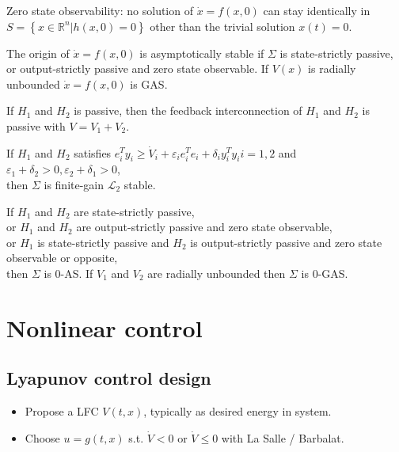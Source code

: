 \begin{definition}
    Zero state observability: no solution of $\dot{x}=f(x, 0)$ can stay identically in $S=\left\{x \in \mathbb{R}^{n} | h(x, 0)=0\right\}$ other than the trivial solution $x(t)=0$.
\end{definition}
\begin{lemma}
    The origin of $\dot{x}=f(x, 0)$ is asymptotically stable if $\Sigma$ is state-strictly passive, or output-strictly passive and zero state observable.
    If $V(x)$ is radially unbounded $\dot{x}=f(x, 0)$ is GAS.
\end{lemma}

\begin{theorem}
    If $H_1$ and $H_2$ is passive, then the feedback interconnection of $H_1$ and $H_2$ is passive with $V=V_1+V_2$.
\end{theorem}
\begin{theorem}
    If $H_1$ and $H_2$ satisfies $e_{i}^{T} y_{i} \geq \dot{V}_{i}+\varepsilon_{i} e_{i}^{T} e_{i}+\delta_{i} y_{i}^{T} y_{i} i=1,2$ and $\varepsilon_{1}+\delta_{2}>0, \varepsilon_{2}+\delta_{1}>0$, \\
    then $\Sigma$ is finite-gain $\mathscr{L}_{2}$ stable.
\end{theorem}
\begin{theorem}
    If $H_1$ and $H_2$ are state-strictly passive,\\
    or $H_1$ and $H_2$ are output-strictly passive and zero state observable,\\
    or $H_1$ is state-strictly passive and $H_2$ is output-strictly passive and zero state observable or opposite,\\
    then $\Sigma$ is 0-AS. If $V_1$ and $V_2$ are radially unbounded then $\Sigma$ is 0-GAS.
\end{theorem}

\section{Nonlinear control}
\subsection{Lyapunov control design}
\begin{tcolorbox}[colback=white, colframe=teal]
\begin{itemize}[topsep=0pt]
    \item Propose a LFC $V(t,x)$, typically as desired energy in system.
    \item Choose $u=g(t,x)$ s.t. $\dot{V}<0$ or $\dot{V}\leq0$ with La Salle / Barbalat.
\end{itemize}
\end{tcolorbox}

